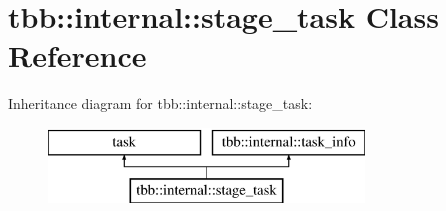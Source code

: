 \hypertarget{classtbb_1_1internal_1_1stage__task}{}\section{tbb\+:\+:internal\+:\+:stage\+\_\+task Class Reference}
\label{classtbb_1_1internal_1_1stage__task}
Inheritance diagram for tbb\+:\+:internal\+:\+:stage\+\_\+task\+:\begin{figure}[H]
\begin{center}
\leavevmode
\includegraphics[height=2.000000cm]{classtbb_1_1internal_1_1stage__task}
\end{center}
\end{figure}
